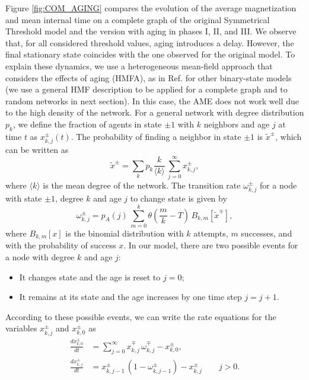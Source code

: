Figure \ref{fig:COM_AGING} compares the evolution of the average magnetization and mean internal time on a complete graph of the original Symmetrical Threshold model and the version with aging in phases I, II, and III. We observe that, for all considered threshold values, aging introduces a delay. However, the final stationary state coincides with the one observed for the original model. To explain these dynamics, we use a heterogeneous mean-field approach that considers the effects of aging (HMFA), as in Ref. \cite{chen-2020} for other binary-state models (we use a general HMF description to be applied for a complete graph and to random networks in next section). In this case, the AME does not work well due to the high density of the network. For a general network with degree distribution $p_k$, we define the fraction of agents in state $\pm 1$ with $k$ neighbors and age $j$ at time $t$ as $x^{\pm}_{k,j} (t)$. The probability of finding a neighbor in state $\pm 1$ is $\tilde{x}^{\pm}$, which can be written as 
\begin{equation}
    \tilde{x}^{\pm} = \sum_k p_k \frac{k}{\langle k \rangle} \,  \sum_{j=0}^{\infty} x^{\pm}_{k,j},
\end{equation}
where $\langle k \rangle$ is the mean degree of the network. The transition rate $\omega_{k,j}^{\pm}$ for a node with state $\pm 1$, degree $k$ and age $j$ to change state is given by 
\begin{equation}
    \omega_{k,j}^{\pm} = p_{A} (j) \,  \sum_{m=0}^{k} \theta\left(\frac{m}{k} - T\right) \,  B_{k,m}[\tilde{x}^{\mp}],
\end{equation}
where $B_{k,m}[x]$ is the binomial distribution with $k$ attempts, $m$ successes, and with the probability of success $x$. In our model, there are two possible events for a node with degree $k$ and age $j$:
\begin{itemize}
    \item It changes state and the age is reset to $j = 0$;
    \item It remains at its state and the age increases by one time step $j = j + 1$.
\end{itemize}
According to these possible events, we can write the rate equations for the variables  $x^{\pm}_{k,j}$ and $x^{\pm}_{k,0}$ as
\begin{eqnarray}
    \frac{dx^{\pm}_{k,0}}{dt} & = \sum_{j=0}^{\infty} x^{\mp}_{k,j} \,  \omega_{k,j}^{\mp} - x^{\pm}_{k,0},\nonumber\\
    \frac{dx^{\pm}_{k,j}}{dt} & =  x^{\pm}_{k,j-1} \,  ( 1 - \omega_{k,j-1}^{\pm}) - x^{\pm}_{k,j} \qquad j > 0. \label{eq:HMFaging2}
\end{eqnarray}
